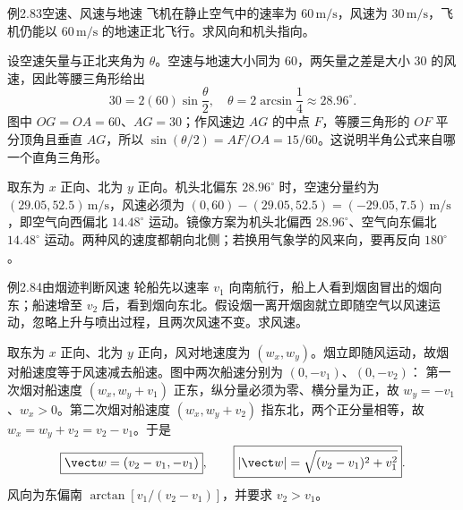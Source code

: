 \KinematicKeepSpace{9cm}
\begin{origexamplebox}{例2.83\quad 空速、风速与地速}
飞机在静止空气中的速率为 $60\,\mathrm{m/s}$，风速为 $30\,\mathrm{m/s}$，飞机仍能以 $60\,\mathrm{m/s}$ 的地速正北飞行。求风向和机头指向。
\end{origexamplebox}
\begin{xesolution}
设空速矢量与正北夹角为 $\theta$。空速与地速大小同为 $60$，两矢量之差是大小 $30$ 的风速，因此等腰三角形给出
\[
30=2(60)\sin\frac\theta2,
\quad
\boxed{\theta=2\arcsin\frac14\approx28.96^\circ}.
\]
\AircraftEqualSpeedDiagram
图中 $OG=OA=60$、$AG=30$；作风速边 $AG$ 的中点 $F$，等腰三角形的 $OF$ 平分顶角且垂直 $AG$，所以 $\sin(\theta/2)=AF/OA=15/60$。这说明半角公式来自哪一个直角三角形。

取东为 $x$ 正向、北为 $y$ 正向。机头北偏东 $28.96^\circ$ 时，空速分量约为 $(29.05,52.5)\,\mathrm{m/s}$，风速必须为 $(0,60)-(29.05,52.5)=(-29.05,7.5)\,\mathrm{m/s}$，即空气向西偏北 $14.48^\circ$ 运动。镜像方案为机头北偏西 $28.96^\circ$、空气向东偏北 $14.48^\circ$ 运动。两种风的速度都朝向北侧；若换用气象学的风来向，要再反向 $180^\circ$。
\end{xesolution}

\begin{origexamplebox}{例2.84\quad 由烟迹判断风速}
轮船先以速率 $v_1$ 向南航行，船上人看到烟囱冒出的烟向东；船速增至 $v_2$ 后，看到烟向东北。假设烟一离开烟囱就立即随空气以风速运动，忽略上升与喷出过程，且两次风速不变。求风速。
\end{origexamplebox}
\begin{xesolution}
取东为 $x$ 正向、北为 $y$ 正向，风对地速度为 $(w_x,w_y)$。烟立即随风运动，故烟对船速度等于风速减去船速。图中两次船速分别为 $(0,-v_1)$、$(0,-v_2)$：
\SmokeWindDiagram
第一次烟对船速度 $(w_x,w_y+v_1)$ 正东，纵分量必须为零、横分量为正，故 $w_y=-v_1$、$w_x>0$。第二次烟对船速度 $(w_x,w_y+v_2)$ 指东北，两个正分量相等，故 $w_x=w_y+v_2=v_2-v_1$。于是
\[
\boxed{\vect w=(v_2-v_1,-v_1)},\qquad
\boxed{|\vect w|=\sqrt{(v_2-v_1)^2+v_1^2}}.
\]
风向为东偏南 $\arctan[v_1/(v_2-v_1)]$，并要求 $v_2>v_1$。
\end{xesolution}

